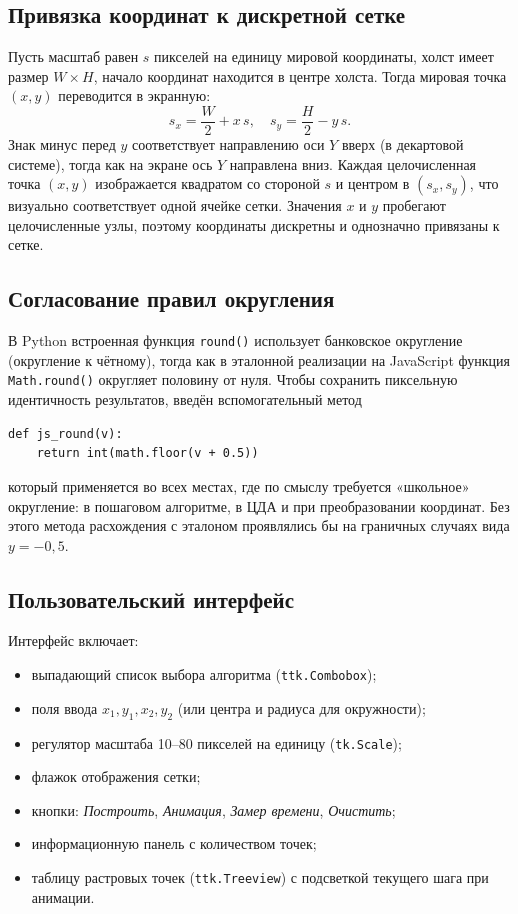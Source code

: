 \documentclass[a4paper,14pt]{extarticle}
\begin{document}
\subsection{Привязка координат к дискретной сетке}
Пусть масштаб равен $s$ пикселей на единицу мировой координаты, холст имеет размер $W\times H$, начало координат находится в центре холста. Тогда мировая точка $(x, y)$ переводится в экранную:
\[
s_x = \frac{W}{2} + x\,s,\quad s_y = \frac{H}{2} - y\,s.
\]
Знак минус перед $y$ соответствует направлению оси $Y$ вверх (в декартовой системе), тогда как на экране ось $Y$ направлена вниз. Каждая целочисленная точка $(x, y)$ изображается квадратом со стороной $s$ и центром в $(s_x, s_y)$, что визуально соответствует одной ячейке сетки. Значения $x$ и $y$ пробегают целочисленные узлы, поэтому координаты дискретны и однозначно привязаны к сетке.

\subsection{Согласование правил округления}
В Python встроенная функция \texttt{round()} использует банковское округление (округление к чётному), тогда как в эталонной реализации на JavaScript функция \texttt{Math.round()} округляет половину от нуля. Чтобы сохранить пиксельную идентичность результатов, введён вспомогательный метод
\begin{lstlisting}[caption={js\_round(v) — округление в стиле Math.round}]
def js_round(v):
    return int(math.floor(v + 0.5))
\end{lstlisting}
который применяется во всех местах, где по смыслу требуется «школьное» округление: в пошаговом алгоритме, в ЦДА и при преобразовании координат. Без этого метода расхождения с эталоном проявлялись бы на граничных случаях вида $y = -0{,}5$.

\subsection{Пользовательский интерфейс}
Интерфейс включает:
\begin{itemize}
  \item выпадающий список выбора алгоритма (\texttt{ttk.Combobox});
  \item поля ввода $x_1, y_1, x_2, y_2$ (или центра и радиуса для окружности);
  \item регулятор масштаба 10–80 пикселей на единицу (\texttt{tk.Scale});
  \item флажок отображения сетки;
  \item кнопки: \textit{Построить}, \textit{Анимация}, \textit{Замер времени}, \textit{Очистить};
  \item информационную панель с количеством точек;
  \item таблицу растровых точек (\texttt{ttk.Treeview}) с подсветкой текущего шага при анимации.
\end{itemize}
\end{document}
